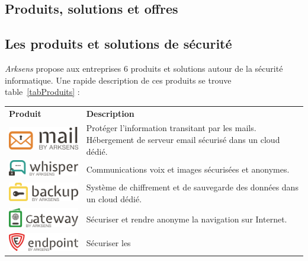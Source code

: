 \documentclass[a4paper,10pt, twoside]{report}
\begin{document}
\begin{spacing}{1.2}
\section{Produits, solutions et offres}
\subsection{Les produits et solutions de sécurité}

\textit{Arksens} propose aux entreprises 6 produits et solutions autour de la
sécurité informatique. Une rapide description de ces produits se trouve
table~\ref{tabProduits} :
\begin{table}[h!]
  \centering
  \def\arraystretch{1.5}
  \setlength{\fboxsep}{13pt} %
  \setlength{\fboxrule}{0pt} %
  \begin{tabular}{m{6cm}m{6cm}}
   \rowcolor{arkred} 
    \arrayrulecolor{gray73}\hline
    \color{white} \textbf{Produit} & \color{white} \textbf{Description} \\
    \includegraphics[width=5cm, fbox]{produits/mail.png} & Protéger l'information
    transitant par les mails. Hébergement de serveur email sécurisé dans
    un cloud dédié.\\
    \hline
    \includegraphics[width=5cm, fbox]{produits/whisper.png} & Communications voix
    et images sécurisées et anonymes.\\
    \hline
    \includegraphics[width=5cm, fbox]{produits/backup.png} & Système de
    chiffrement et de sauvegarde des données dans un cloud dédié.\\
    \hline
    \includegraphics[width=5cm, fbox]{produits/gateway.png} & Sécuriser et
    rendre anonyme la navigation sur Internet.\\
    \hline
    \includegraphics[width=5cm, fbox]{produits/endpoint.png} & Sécuriser les

\end{tabular}
\end{table}
\end{spacing}
\end{document}
